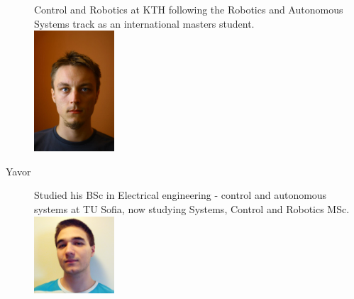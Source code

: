 \documentclass[10pt,a4paper]{article}
\begin{document}
\begin{description}
  Control and Robotics at KTH following the Robotics and Autonomous Systems
  track as an international masters student.
  \\
  \includegraphics[width=3cm]{../images/michal.jpg}
\item[Yavor] Studied his BSc in Electrical engineering - control and autonomous
  systems at TU Sofia, now studying Systems, Control and Robotics MSc.\\
  \includegraphics[width=3cm]{../images/yavor.jpg}
\end{description}
\end{document}
